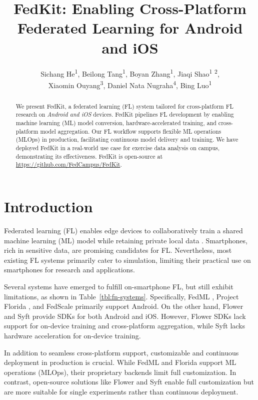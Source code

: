 \documentclass[letterpaper]{article} %
\title{FedKit: Enabling Cross-Platform Federated Learning for Android and iOS}
\author{
    Sichang He\textsuperscript{\rm 1},
    Beilong Tang\textsuperscript{\rm 1},
    Boyan Zhang\textsuperscript{\rm 1},
    Jiaqi Shao\textsuperscript{\rm 1} \textsuperscript{\rm 2},
    \\
    Xiaomin Ouyang\textsuperscript{\rm 3},
    Daniel Nata Nugraha\textsuperscript{\rm 4},
    Bing Luo\textsuperscript{\rm 1}
}
\begin{document}
\maketitle

\begin{abstract}
    We present FedKit, a federated learning (FL) system tailored for
    cross-platform FL research on \textit{Android and iOS} devices.
    FedKit pipelines FL development by
    enabling machine learning (ML) model conversion,
    hardware-accelerated training,
    and cross-platform model aggregation.
    Our FL workflow supports flexible ML operations (MLOps) in production,
    facilitating continuous model delivery and training.
    We have deployed FedKit in a real-world use case for
    exercise data analysis on campus,
    demonstrating its effectiveness.
    FedKit is open-source at \url{https://github.com/FedCampus/FedKit}.
\end{abstract}

\section{Introduction}

Federated learning (FL) enables edge devices to
collaboratively train a shared machine learning (ML) model while
retaining private local data \cite{mcmahan2017communication}.
Smartphones, rich in sensitive data,
are promising candidates for FL.
Nevertheless, most existing FL systems
\cite[e.g.,][]{bonawitz2019towards,ma2019paddlepaddle,liu2021fate,openfl_citation}
primarily cater to simulation,
limiting their practical use on smartphones for research and applications.

Several systems have emerged to fulfill on-smartphone FL,
but still exhibit limitations,
as shown in Table~\ref{tbl:fn-systems}.
Specifically, FedML \cite{he2020fedml},
Project Florida \cite{madrigal2023project},
and FedScale \cite{lai2022fedscale} primarily support Android.
On the other hand,
Flower \cite{beutel2020flower,mathur2021ondevice} and
Syft \cite{ryffel2018generic,Ziller2021,hall2021syft}
provide SDKs for both Android and iOS.
However, Flower SDKs lack support for on-device training and
cross-platform aggregation,
while Syft lacks hardware acceleration for on-device training.

In addition to seamless cross-platform support,
customizable and continuous deployment in production is crucial.
While FedML and Florida support ML operations (MLOps),
their proprietary backends limit full customization.
In contrast, open-source solutions like Flower and Syft enable
full customization
but are more suitable for single experiments rather than continuous deployment.
\end{document}
